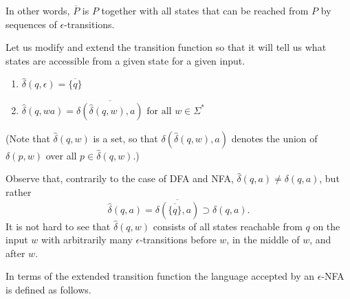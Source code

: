 

\setcounter{section}{1}
\setcounter{subsection}{4}
\setcounter{dfn}{14}

In other words, $\overline{P}$ is $P$ together with all states that can be reached from $P$ by sequences of $\epsilon$-transitions.

Let us modify and extend the transition function so that it will tell us what states are accessible from a given state
for a given input.
\begin{enumerate}
\item
$\widehat{\delta}(q, \epsilon) = \overline{\{q\}}$
\item
$\widehat{\delta}(q, wa) = \overline{\delta(\widehat{\delta}(q,w), a)} \text{ for all }w \in \Sigma^*$
\end{enumerate}
(Note that $\widehat\delta(q,w)$ is a set, so that $\delta(\widehat{\delta}(q,w), a)$ denotes
the union of $\delta(p,w)$ over all $p \in \widehat{\delta}(q,w)$.)

Observe that, contrarily to the case of DFA and NFA, $\widehat{\delta}(q,a) \ne \delta(q,a)$, but rather
\[
\widehat{\delta}(q,a) = \overline{\delta(\overline{\{q\}}, a)} \supset \delta(q,a).
\]
It is not hard to see that $\widehat{\delta}(q,w)$ consists of all states reachable from $q$ on the input $w$
with arbitrarily many $\epsilon$-transitions before $w$, in the middle of $w$, and after $w$.

In terms of the extended transition function the language accepted by an $\epsilon$-NFA is defined as follows.

